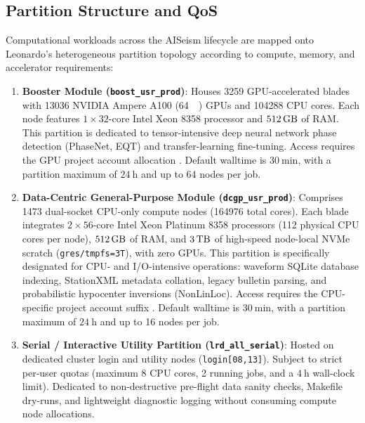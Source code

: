 \subsection{Partition Structure and \acs{QoS}}
Computational workloads across the AISeism lifecycle are mapped onto Leonardo's
heterogeneous partition topology according to compute, memory, and accelerator
requirements:
\begin{enumerate}
  \item \textbf{Booster Module (\texttt{boost\_usr\_prod})}:
    Houses \num{3259} \ac{GPU}-accelerated blades with \num{13036}
    NVIDIA Ampere A100 (\qty{64}{\giga\byte})
    \acp{GPU} and \num{104288} \ac{CPU} cores. Each node features $\num{1}
    \times \num{32}$-core Intel
    Xeon 8358 processor and $\qty{512}{\giga\byte}$ of \ac{RAM}.
    This partition is dedicated to tensor-intensive deep neural network phase
    detection (\ac{PhaseNet}, \ac{EQT}) and transfer-learning fine-tuning.
    Access requires the \ac{GPU} project account allocation
    .
    Default walltime is $\qty{30}{\minute}$, with a partition maximum of
    $\qty{24}{\hour}$ and up to \num{64} nodes per job.
  \item \textbf{Data-Centric General-Purpose Module
    (\texttt{dcgp\_usr\_prod})}: Comprises \num{1473} dual-socket \ac{CPU}-only
    compute nodes (\num{164976} total cores). Each blade integrates
    $\num{2} \times \num{56}$-core Intel Xeon Platinum 8358
    processors (\num{112} physical \ac{CPU} cores
    per node), $\qty{512}{\giga\byte}$ of \ac{RAM}, and
    $\qty{3}{\tera\byte}$ of
    high-speed node-local NVMe scratch (\texttt{gres/tmpfs=3T}), with zero
    \acp{GPU}. This partition is specifically designated for \ac{CPU}- and
    I/O-intensive operations: waveform SQLite database indexing, StationXML
    metadata collation, legacy bulletin parsing, and probabilistic hypocenter
    inversions (\ac{NonLinLoc}). Access requires the \ac{CPU}-specific project
    account suffix . Default walltime is
    $\qty{30}{\minute}$, with a
    partition maximum of $\qty{24}{\hour}$ and up to \num{16} nodes per job.
  \item \textbf{Serial / Interactive Utility Partition
    (\texttt{lrd\_all\_serial})}: Hosted on dedicated cluster login and utility
    nodes (\texttt{login[08,13]}). Subject to strict per-user quotas
    (maximum \num{8} \ac{CPU} cores, \num{2} running jobs, and a
    $\qty{4}{\hour}$ wall-clock limit).
    Dedicated to non-destructive pre-flight data sanity checks, Makefile
    dry-runs, and lightweight diagnostic logging without consuming compute node
    allocations.
\end{enumerate}

